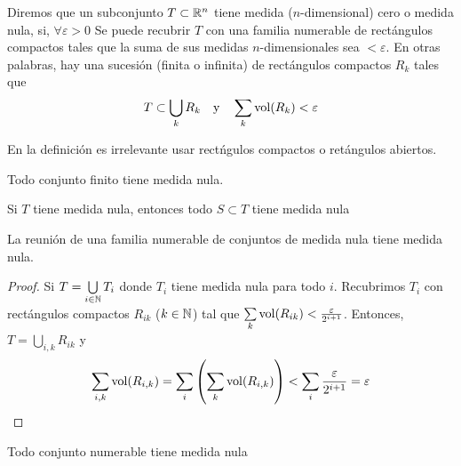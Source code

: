 \begin{defi}
	Diremos que un subconjunto $T \subset \mathbb{R}^n$ tiene medida ($n$-dimensional)
	cero o medida nula, si, $\forall \varepsilon > 0$ Se puede recubrir $T$ con
	una familia numerable de rectángulos compactos tales que la suma de sus
	medidas $n$-dimensionales sea $< \varepsilon$. En otras palabras, hay una
	sucesión (finita o infinita) de rectángulos compactos $R_k$ tales que
	\[
		T \subset \bigcup_k R_k \quad \text{y} \quad \sum_k \operatorname{vol}(R_k) <
		\varepsilon
	\]
\end{defi}
\begin{obs*}
	En la definición es irrelevante usar rectńgulos compactos o retángulos
	abiertos.
\end{obs*}
\begin{obs}
	Todo conjunto finito tiene medida nula.
\end{obs}
\begin{obs}
	Si $T$ tiene medida nula, entonces todo $S \subset T$ tiene medida nula
\end{obs}
\begin{prop}
	La reunión de una familia numerable de conjuntos de medida nula tiene
	medida nula.
\end{prop}
\begin{proof}
	Si $T = \bigcup\limits_{i \in \mathbb{N}} T_i$ donde $T_i$ tiene medida nula para todo
	$i$. Recubrimos $T_i$ con rectángulos compactos $R_{ik}$ ($k \in \mathbb{N}$) tal que
	$\sum\limits_k \operatorname{vol}(R_{ik}) < \frac{\varepsilon}{2^{i+1}}$. Entonces,
	$T = \bigcup\limits_{i,k} R_{ik}$ y
	\[
		\sum_{i,k} \operatorname{vol}(R_{i,k}) = \sum_i \left( \sum_k \operatorname{vol}(R_{i,k}) \right) <
		\sum_i \frac{\varepsilon}{2^{i+1}} = \varepsilon
	\]
\end{proof}

\begin{col*}
	Todo conjunto numerable tiene medida nula
\end{col*}

